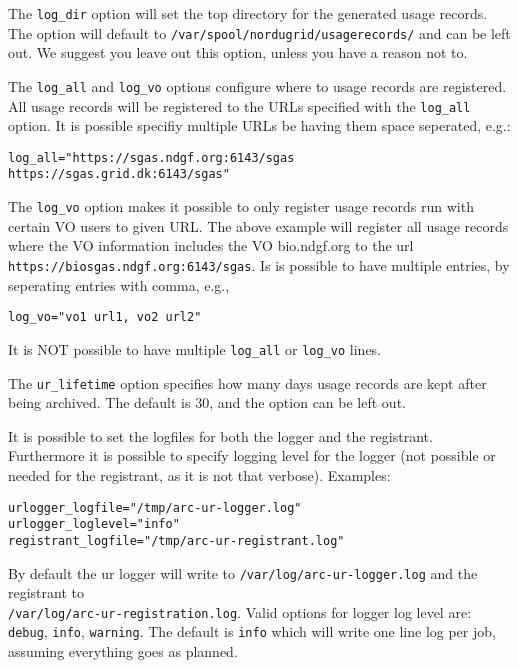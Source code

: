 \documentclass{article}
\begin{document}
The \texttt{log\_dir} option will set the top directory for the generated usage
records. The option will default to \texttt{/var/spool/nordugrid/usagerecords/}
and can be left out. We suggest you leave out this option, unless you have a
reason not to.

The \texttt{log\_all} and \texttt{log\_vo} options configure where to usage
records are registered. All usage records will be registered to the URLs
specified with the \texttt{log\_all} option. It is possible specifiy multiple
URLs be having them space seperated, e.g.:

\begin{verbatim}
log_all="https://sgas.ndgf.org:6143/sgas https://sgas.grid.dk:6143/sgas"
\end{verbatim}

The \texttt{log\_vo} option makes it possible to only register usage records run
with certain VO users to given URL. The above example will register all usage
records where the VO information includes the VO bio.ndgf.org to the url
\texttt{https://biosgas.ndgf.org:6143/sgas}. Is is possible to have multiple
entries, by seperating entries with comma, e.g.,

\begin{verbatim}
log_vo="vo1 url1, vo2 url2"
\end{verbatim}

It is NOT possible to have multiple \texttt{log\_all} or \texttt{log\_vo} lines.


The \texttt{ur\_lifetime} option specifies how many days usage records are kept
after being archived. The default is 30, and the option can be left out.


It is possible to set the logfiles for both the logger and the registrant.
Furthermore it is possible to specify logging level for the logger (not
possible or needed for the registrant, as it is not that verbose). Examples:

\begin{verbatim}
urlogger_logfile="/tmp/arc-ur-logger.log"
urlogger_loglevel="info"
registrant_logfile="/tmp/arc-ur-registrant.log"
\end{verbatim}

By default the ur logger will write to \texttt{/var/log/arc-ur-logger.log} and
the registrant to \\ \texttt{/var/log/arc-ur-registration.log}. Valid options
for logger log level are: \texttt{debug}, \texttt{info}, \texttt{warning}. The
default is \texttt{info} which will write one line log per job, assuming
everything goes as planned.
\end{document}
